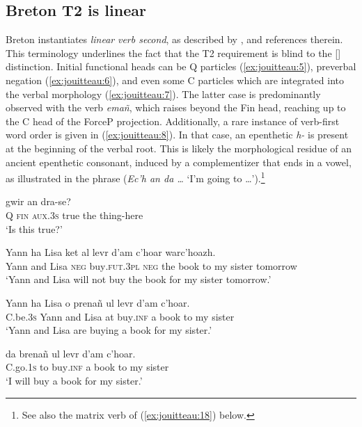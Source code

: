 \documentclass[output=paper,colorlinks,citecolor=brown]{langscibook}
\begin{document}
\subsection{Breton T2 is linear}

Breton instantiates \textit{linear} \textit{verb second}, as described by \citet{mj:BorsleyKathol2000}, \citet{mj:Jouitteau2020} and references therein. This terminology underlines the fact that the T2 requirement is blind to the [] distinction. Initial functional heads can be Q particles (\ref{ex:jouitteau:5}), preverbal negation (\ref{ex:jouitteau:6}), and even some C particles which are integrated into the verbal morphology (\ref{ex:jouitteau:7}). The latter case is predominantly observed with the verb \textit{emañ}, which raises beyond the Fin head, reaching up to the C head of the ForceP projection. Additionally, a rare instance of verb-first word order is given in (\ref{ex:jouitteau:8}). In that case, an epenthetic \textit{h-} is present at the beginning of the verbal root. This is likely the morphological residue of an ancient epenthetic consonant, induced by a complementizer that ends in a vowel, as illustrated in the phrase (\textit{Ec'h an da …} `I'm going to …').\footnote{See also the matrix verb of (\ref{ex:jouitteau:18}) below.}


\ea \label{ex:jouitteau:5}
\gll {} {} {} gwir an dra-se? \\
Q \textsc{fin} \textsc{aux.3s}   true   the  thing-here \\
\glt ‘Is this true?’
\z 


\ea \label{ex:jouitteau:6}
\gll Yann  ha   Lisa      {}      ket   al    levr  d'am   c’hoar   warc'hoazh.\\
Yann   and Lisa   \textsc{neg}  buy\textsc{.fut.3pl} \textsc{neg}  the  book {to my} sister tomorrow \\
\glt  ‘Yann and Lisa will not buy the book for my sister tomorrow.’ 
\z 

\ea%
    \label{ex:jouitteau:7}
    \gll {} Yann  ha  Lisa   o  prenañ  ul levr  d'am   c’hoar.\\
        C.be\textsc{.3s} Yann and Lisa  at buy\textsc{.inf}   a  book {to my} sister  \\
    \glt ‘Yann and Lisa are buying a book for my sister.’
    \z

\ea
    \label{ex:jouitteau:8}
    \gll {}      da brenañ  ul levr   d'am   c’hoar. \\
     C.go\textsc{.1s}  to buy\textsc{.inf}   a  book {to my} sister \\
    \glt ‘I will buy a book for my sister.’
    \z 
\end{document}
